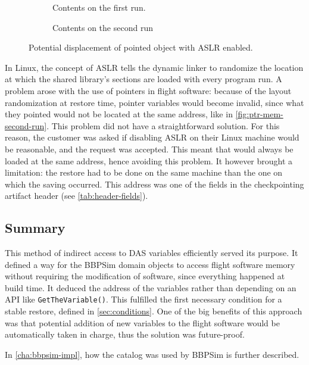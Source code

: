 {\begin{figure}[htbp]
	\centering
	\begin{subfigure}[t]{.58\linewidth}
		\small
		\centering
		
		\caption{Contents on the first run.}
		\label{fig:ptr-mem-first-run}
	\end{subfigure}%
	\begin{subfigure}[t]{.38\linewidth}
		\small
		\centering
		
		\caption{Contents on the second run}
		\label{fig:ptr-mem-second-run}
	\end{subfigure}
	\caption{Potential displacement of pointed object with ASLR enabled.}
	\label{fig:mem-displacement}
\end{figure}

In Linux, the concept of \gls{ASLR} tells the dynamic linker to randomize the location at which the shared library's sections are loaded with every program run. A problem arose with the use of pointers in flight software: because of the layout randomization at restore time, pointer variables would become invalid, since what they pointed would not be located at the same address, like in \autoref{fig:ptr-mem-second-run}. This problem did not have a straightforward solution. For this reason, the customer was asked if disabling \gls{ASLR} on their Linux machine would be reasonable, and the request was accepted. This meant that  would always be loaded at the same address, hence avoiding this problem. It however brought a limitation: the restore had to be done on the same machine than the one on which the saving occurred. This address was one of the fields in the checkpointing artifact header (see \autoref{tab:header-fields}).

\subsection*{Summary}
This method of indirect access to DAS variables efficiently served its purpose. It defined a way for the BBPSim domain objects to access flight software memory without requiring the modification of software, since everything happened at build time. It deduced the address of the variables rather than depending on an API like \texttt{GetTheVariable()}. This fulfilled the first necessary condition for a stable restore, defined in \autoref{sec:conditions}. One of the big benefits of this approach was that potential addition of new variables to the flight software would be automatically taken in charge, thus the solution was future-proof.

In \autoref{cha:bbpsim-impl}, how the catalog was used by \gls{BBPSim} is further described.
}